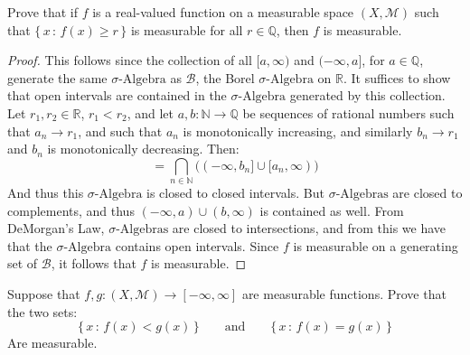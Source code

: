 \documentclass[crop=false,class=article]{standalone}                           %
\begin{document}
        \begin{problem}
            Prove that if $f$ is a real-valued function on a measurable space
            $(X,\mathcal{M})$ such that $\{\,x\,:\,f(x)\geq{r}\,\}$ is measurable
            for all $r\in\mathbb{Q}$, then $f$ is measurable.
        \end{problem}
        \begin{proof}
            This follows since the collection of all $[a,\infty)$ and
            $(\minus\infty,a]$, for $a\in\mathbb{Q}$, generate the same
            $\sigma\textrm{-Algebra}$ as $\mathcal{B}$, the Borel
            $\sigma\textrm{-Algebra}$ on $\mathbb{R}$. It suffices to show that open
            intervals are contained in the $\sigma\textrm{-Algebra}$ generated by
            this collection. Let $r_{1},r_{2}\in\mathbb{R}$, $r_{1}<r_{2}$, and let
            $a,b:\mathbb{N}\rightarrow\mathbb{Q}$ be sequences of rational numbers
            such that $a_{n}\rightarrow{r}_{1}$, and such that $a_{n}$ is
            monotonically increasing, and similarly $b_{n}\rightarrow{r}_{1}$ and
            $b_{n}$ is monotonically decreasing. Then:
            \begin{equation}
                [r_{1},r_{2}]=\bigcap_{n\in\mathbb{N}}
                    \Big((\minus\infty,b_{n}]\cup[a_{n},\infty)\Big)
            \end{equation}
            And thus this $\sigma\textrm{-Algebra}$ is closed to closed intervals.
            But $\sigma\textrm{-Algebras}$ are closed to complements, and thus
            $(\minus{\infty},a)\cup(b,\infty)$ is contained as well. From DeMorgan's
            Law, $\sigma\textrm{-Algebras}$ are closed to intersections, and from
            this we have that the $\sigma\textrm{-Algebra}$ contains open intervals.
            Since $f$ is measurable on a generating set of $\mathcal{B}$, it follows
            that $f$ is measurable.
        \end{proof}
        \begin{problem}
            Suppose that $f,g:(X,\mathcal{M})\rightarrow[\minus\infty,\infty]$
            are measurable functions. Prove that the two sets:
            \begin{equation}
                \{\,x\,:\,f(x)<g(x)\,\}
                \quad\quad\textrm{and}\quad\quad
                \{\,x\,:\,f(x)=g(x)\,\}
            \end{equation}
            Are measurable.
        \end{problem}
\end{document}
